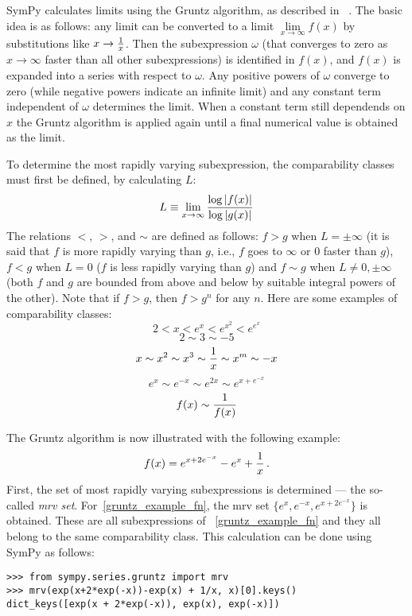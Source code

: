 SymPy calculates limits using the Gruntz algorithm, as described in%
~\cite{Gruntz1996limits}. The basic idea is as follows: any limit can be
converted to a limit $\lim\limits_{x\to\infty} f(x)$ by substitutions like
$x\to{1\over x}$. Then the subexpression $\omega$ (that converges
to zero as $x\to\infty$ faster than all other subexpressions) is identified in
$f(x)$, and $f(x)$ is expanded into a series with respect to $\omega$. Any
positive powers of $\omega$ converge to zero (while negative powers indicate
an infinite limit) and any constant term independent of
$\omega$ determines the limit. When a constant term still dependends on
$x$ the Gruntz algorithm is applied again until a final numerical value
is obtained as the limit.

To determine the most rapidly varying subexpression, the comparability classes
must first be defined, by calculating $L$:
\begin{equation}
L\equiv \lim_{x\to\infty} {\log |f(x)| \over \log |g(x)|}
\end{equation}
The relations $<$, $>$, and $\sim$ are defined as follows: $f>g$ when
$L=\pm\infty$ (it is said that $f$ is more rapidly varying than $g$, i.e., $f$
goes to $\infty$ or $0$ faster than $g$), $f<g$ when $L=0$ ($f$ is less
rapidly varying than $g$) and $f\sim g$ when $L\neq 0,\pm\infty$ (both $f$ and
$g$ are bounded from above and below by suitable integral powers of the
other). Note that if $f > g$, then $f > g^n$ for any $n$. Here
are some examples of comparability classes:
\[2 < x < e^x < e^{x^2} < e^{e^x}\]
\[2\sim 3\sim -5\]
\[x\sim x^2\sim x^3\sim {1\over x}\sim x^m\sim -x\]
\[e^x\sim e^{-x}\sim e^{2x}\sim e^{x+e^{-x}}\]
\[f(x)\sim{1\over f(x)}\]

The Gruntz algorithm is now illustrated with the following example:
\begin{equation}
    \label{gruntz_example_fn}
f(x) = e^{x+2e^{-x}} - e^x + {1\over x} \,.
\end{equation}
First, the set of most rapidly varying subexpressions is determined ---
the so-called \textit{mrv set}. For~\eqref{gruntz_example_fn}, the mrv set
$\{e^x, e^{-x}, e^{x+2e^{-x}}\}$ is obtained. These are all subexpressions of%
~\eqref{gruntz_example_fn} and they all belong to the same comparability
class. This calculation can be done using SymPy as follows:

\begin{verbatim}
>>> from sympy.series.gruntz import mrv
>>> mrv(exp(x+2*exp(-x))-exp(x) + 1/x, x)[0].keys()
dict_keys([exp(x + 2*exp(-x)), exp(x), exp(-x)])
\end{verbatim}

